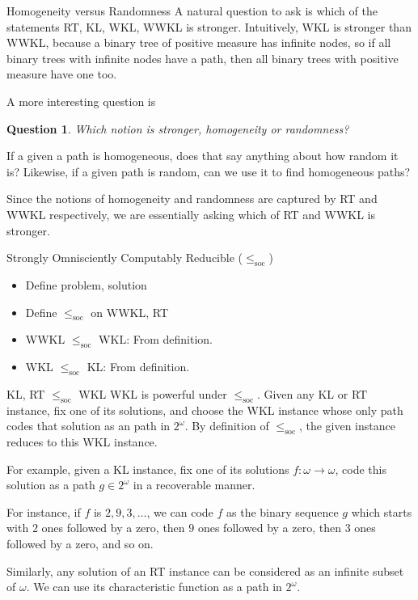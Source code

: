 \begin{frame}{Homogeneity versus Randomness}
  A natural question to ask is which of the statements RT, KL, WKL, WWKL is
  stronger. Intuitively, WKL is stronger than WWKL, because a binary tree
  of positive measure has infinite nodes, so if all binary trees with
  infinite nodes have a path, then all binary trees with positive measure
  have one too.

  \vspace{0.5em}
  A more interesting question is
  \newtheorem*{question*}{Question}
  \begin{question*}
    Which notion is stronger, homogeneity or randomness?
  \end{question*}
  If a given a path is homogeneous, does that say anything about how random
  it is? Likewise, if a given path is random, can we use it to find
  homogeneous paths?

  \vspace{0.5em}
  Since the notions of homogeneity and randomness are captured by RT and
  WWKL respectively, we are essentially asking which of RT and WWKL is
  stronger.
\end{frame}

\begin{frame}{Strongly Omnisciently Computably Reducible
($\leq_{\text{soc}}$)}
  \begin{itemize}
    \item Define problem, solution
    \item Define $\leq_{\text{soc}}$ on WWKL, RT
    \item WWKL $\leq_{\text{soc}}$ WKL: From definition.
    \item WKL $\leq_{\text{soc}}$ KL: From definition.
  \end{itemize}
\end{frame}

\begin{frame}{KL, RT $\leq_{\text{soc}}$ WKL}
  WKL is powerful under $\leq_{\text{soc}}$. Given any KL or RT
  instance, fix one of its solutions, and choose the WKL instance whose only
  path codes that solution as an path in $2^\omega$. By definition of
  $\leq_{\text{soc}}$, the given instance reduces to this WKL instance.

  \vspace{1em}
  For example, given a KL instance, fix one of its solutions
  $f:\omega\rightarrow\omega$, code this solution as a path $g\in2^\omega$
  in a recoverable manner.

  \vspace{1em}
  For instance, if $f$ is $2,9,3,\ldots$, we can code $f$ as the binary
  sequence $g$ which starts with $2$ ones followed by a zero, then $9$ ones
  followed by a zero, then $3$ ones followed by a zero, and so on.

  \vspace{1em}
  Similarly, any solution of an RT instance can be considered as an
  infinite subset of $\omega$. We can use its characteristic function as a
  path in $2^\omega$.
\end{frame}

